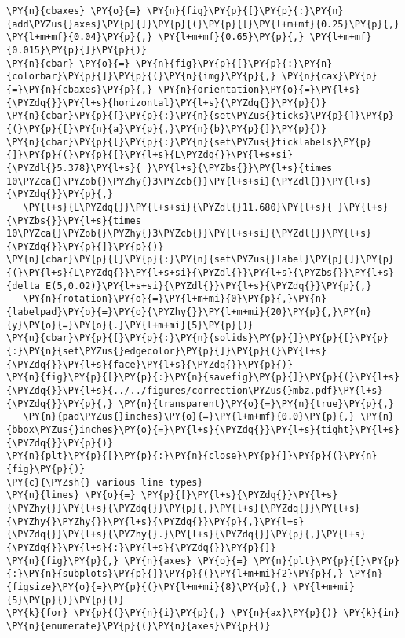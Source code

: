 \begin{Verbatim}[commandchars=\\\{\}]
\PY{n}{cbaxes} \PY{o}{=} \PY{n}{fig}\PY{p}{[}\PY{p}{:}\PY{n}{add\PYZus{}axes}\PY{p}{]}\PY{p}{(}\PY{p}{[}\PY{l+m+mf}{0.25}\PY{p}{,} \PY{l+m+mf}{0.04}\PY{p}{,} \PY{l+m+mf}{0.65}\PY{p}{,} \PY{l+m+mf}{0.015}\PY{p}{]}\PY{p}{)}
\PY{n}{cbar} \PY{o}{=} \PY{n}{fig}\PY{p}{[}\PY{p}{:}\PY{n}{colorbar}\PY{p}{]}\PY{p}{(}\PY{n}{img}\PY{p}{,} \PY{n}{cax}\PY{o}{=}\PY{n}{cbaxes}\PY{p}{,} \PY{n}{orientation}\PY{o}{=}\PY{l+s}{\PYZdq{}}\PY{l+s}{horizontal}\PY{l+s}{\PYZdq{}}\PY{p}{)}
\PY{n}{cbar}\PY{p}{[}\PY{p}{:}\PY{n}{set\PYZus{}ticks}\PY{p}{]}\PY{p}{(}\PY{p}{[}\PY{n}{a}\PY{p}{,}\PY{n}{b}\PY{p}{]}\PY{p}{)}
\PY{n}{cbar}\PY{p}{[}\PY{p}{:}\PY{n}{set\PYZus{}ticklabels}\PY{p}{]}\PY{p}{(}\PY{p}{[}\PY{l+s}{L\PYZdq{}}\PY{l+s+si}{\PYZdl{}5.378}\PY{l+s}{ }\PY{l+s}{\PYZbs{}}\PY{l+s}{times 10\PYZca{}\PYZob{}\PYZhy{}3\PYZcb{}}\PY{l+s+si}{\PYZdl{}}\PY{l+s}{\PYZdq{}}\PY{p}{,}
   \PY{l+s}{L\PYZdq{}}\PY{l+s+si}{\PYZdl{}11.680}\PY{l+s}{ }\PY{l+s}{\PYZbs{}}\PY{l+s}{times 10\PYZca{}\PYZob{}\PYZhy{}3\PYZcb{}}\PY{l+s+si}{\PYZdl{}}\PY{l+s}{\PYZdq{}}\PY{p}{]}\PY{p}{)}
\PY{n}{cbar}\PY{p}{[}\PY{p}{:}\PY{n}{set\PYZus{}label}\PY{p}{]}\PY{p}{(}\PY{l+s}{L\PYZdq{}}\PY{l+s+si}{\PYZdl{}}\PY{l+s}{\PYZbs{}}\PY{l+s}{delta E(5,0.02)}\PY{l+s+si}{\PYZdl{}}\PY{l+s}{\PYZdq{}}\PY{p}{,}
   \PY{n}{rotation}\PY{o}{=}\PY{l+m+mi}{0}\PY{p}{,}\PY{n}{labelpad}\PY{o}{=}\PY{o}{\PYZhy{}}\PY{l+m+mi}{20}\PY{p}{,}\PY{n}{y}\PY{o}{=}\PY{o}{.}\PY{l+m+mi}{5}\PY{p}{)}
\PY{n}{cbar}\PY{p}{[}\PY{p}{:}\PY{n}{solids}\PY{p}{]}\PY{p}{[}\PY{p}{:}\PY{n}{set\PYZus{}edgecolor}\PY{p}{]}\PY{p}{(}\PY{l+s}{\PYZdq{}}\PY{l+s}{face}\PY{l+s}{\PYZdq{}}\PY{p}{)}
\PY{n}{fig}\PY{p}{[}\PY{p}{:}\PY{n}{savefig}\PY{p}{]}\PY{p}{(}\PY{l+s}{\PYZdq{}}\PY{l+s}{../../figures/correction\PYZus{}mbz.pdf}\PY{l+s}{\PYZdq{}}\PY{p}{,} \PY{n}{transparent}\PY{o}{=}\PY{n}{true}\PY{p}{,}
   \PY{n}{pad\PYZus{}inches}\PY{o}{=}\PY{l+m+mf}{0.0}\PY{p}{,} \PY{n}{bbox\PYZus{}inches}\PY{o}{=}\PY{l+s}{\PYZdq{}}\PY{l+s}{tight}\PY{l+s}{\PYZdq{}}\PY{p}{)}
\PY{n}{plt}\PY{p}{[}\PY{p}{:}\PY{n}{close}\PY{p}{]}\PY{p}{(}\PY{n}{fig}\PY{p}{)}
\PY{c}{\PYZsh{} various line types}
\PY{n}{lines} \PY{o}{=} \PY{p}{[}\PY{l+s}{\PYZdq{}}\PY{l+s}{\PYZhy{}}\PY{l+s}{\PYZdq{}}\PY{p}{,}\PY{l+s}{\PYZdq{}}\PY{l+s}{\PYZhy{}\PYZhy{}}\PY{l+s}{\PYZdq{}}\PY{p}{,}\PY{l+s}{\PYZdq{}}\PY{l+s}{\PYZhy{}.}\PY{l+s}{\PYZdq{}}\PY{p}{,}\PY{l+s}{\PYZdq{}}\PY{l+s}{:}\PY{l+s}{\PYZdq{}}\PY{p}{]}
\PY{n}{fig}\PY{p}{,} \PY{n}{axes} \PY{o}{=} \PY{n}{plt}\PY{p}{[}\PY{p}{:}\PY{n}{subplots}\PY{p}{]}\PY{p}{(}\PY{l+m+mi}{2}\PY{p}{,} \PY{n}{figsize}\PY{o}{=}\PY{p}{(}\PY{l+m+mi}{8}\PY{p}{,} \PY{l+m+mi}{5}\PY{p}{)}\PY{p}{)}
\PY{k}{for} \PY{p}{(}\PY{n}{i}\PY{p}{,} \PY{n}{ax}\PY{p}{)} \PY{k}{in} \PY{n}{enumerate}\PY{p}{(}\PY{n}{axes}\PY{p}{)}

\end{Verbatim}

